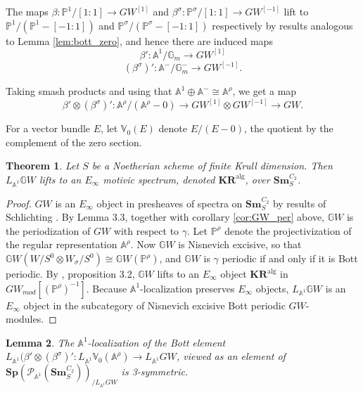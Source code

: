 \documentclass[edeposit,fullpage]{uiucthesis2009}
\newcommand{\mbb}{\mathbb}
\newcommand{\mc}{\mathcal}
\newcommand{\Sm}[1]{\mathbf{Sm}_{#1}}
\newcommand{\Sp}{\mathbf{Sp}}
\newcommand{\KR}{\mathbf{KR}^{\mathrm{alg}}}
\theoremstyle{plain}
\newtheorem{lemma}{Lemma}
\numberwithin{lemma}{section}
\newtheorem{theorem}[lemma]{Theorem}
\theoremstyle{definition}
\begin{document}
The maps $\beta :  \mbb P^1/[1:1] \rightarrow GW^{[1]}$ and
$\beta^\sigma : \mbb P^\sigma/[1:1] \rightarrow GW^{[-1]}$ lift to
$\mbb P^1/(\mbb P^1 - [-1:1])$ and $\mbb P^\sigma/(\mbb P^\sigma -
[-1:1])$ respectively by results analogous to Lemma
\ref{lem:bott_zero}, and hence there are induced maps 
\[
\beta' : \mbb A^1/\mbb G_m \rightarrow GW^{[1]}
\]
\[
(\beta^\sigma)' : \mbb A^-/\mbb G_m^- \rightarrow GW^{[-1]}.
\]

Taking smash products and using that $\mbb A^1 \oplus \mbb A^- \cong
\mbb A^\rho$, we get a map
\[
\beta' \otimes (\beta^\sigma)' : \mbb
A^\rho/(\mbb A^\rho - 0) \rightarrow GW^{[1]} \otimes GW^{[-1]}
\rightarrow GW.
\]

For a vector bundle $E$, let $\mbb V_0(E)$ denote $E/(E-0)$, the
quotient by the complement of the zero section.

\begin{theorem}\label{thm:GW_Einfty}
Let $S$ be a Noetherian scheme of finite Krull dimension. Then $L_{\mbb A^1}\mbb GW$ lifts to an $E_\infty$ motivic spectrum, denoted
$\KR$, over $\Sm{S}^{C_2}$.
\end{theorem}

\begin{proof}
$GW$ is an $E_\infty$ object in presheaves of spectra on
$\Sm{S}^{C_2}$ by results of Schlichting \cite{Schder}. By
\cite{cdhdesc} Lemma 3.3, together with corollary \ref{cor:GW_per}
above, $\mbb GW$ is the periodization of $GW$ with respect to
$\gamma$. Let $\mbb P^\rho$ denote the projectivization of the regular
representation $\mbb A^\rho$. Now $\mbb GW$ is Nisnevich excisive, so that $\mbb GW(W/S^0
\otimes W_\sigma/S^0) \cong \mbb GW(\mbb P^\rho)$, and $\mbb GW$ is
$\gamma$ periodic if and only if it is Bott periodic. By \cite{cdhdesc}, proposition 3.2, $\mbb GW$ lifts to an
$E_\infty$ object $\KR$ in $GW_{mod}[(\mbb P^\rho)^{-1}]$. Because $\mbb A^1$-localization preserves
$E_\infty$ objects, $L_{\mbb A^1}\mbb GW$ is an $E_\infty$ object in
the subcategory of Nisnevich excisive Bott periodic
$GW$-modules. 
\end{proof}

\begin{lemma}\label{lem:bott_3symm}
The $\mbb A^1$-localization of the Bott element $L_{\mbb A^1}(\beta'
\otimes (\beta^\sigma)' : L_{\mbb A^1} \mbb V_0(\mbb A^\rho)
\rightarrow L_{\mbb A^1} GW$, viewed as an element of $\Sp(\mc P_{\mbb
  A^1}(\Sm{S}^{C_2}))_{/L_{\mbb A^1}GW}$ is 3-symmetric.
\end{lemma}
\end{document}
